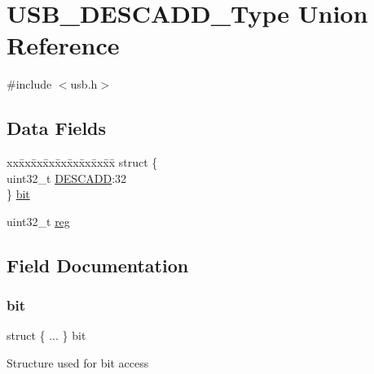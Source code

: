 \hypertarget{union_u_s_b___d_e_s_c_a_d_d___type}{}\section{U\+S\+B\+\_\+\+D\+E\+S\+C\+A\+D\+D\+\_\+\+Type Union Reference}
\label{union_u_s_b___d_e_s_c_a_d_d___type}


{\ttfamily \#include $<$usb.\+h$>$}

\subsection*{Data Fields}
\begin{DoxyCompactItemize}
\item 
\begin{tabbing}
xx\=xx\=xx\=xx\=xx\=xx\=xx\=xx\=xx\=\kill
struct \{\\
\>uint32\_t \mbox{\hyperlink{union_u_s_b___d_e_s_c_a_d_d___type_afb5de23aa0c3ffcad2485cce138306f4}{DESCADD}}:32\\
\} \mbox{\hyperlink{union_u_s_b___d_e_s_c_a_d_d___type_ac9bd64f1dabe296c25ac82012d4e639d}{bit}}\\

\end{tabbing}\item 
uint32\+\_\+t \mbox{\hyperlink{union_u_s_b___d_e_s_c_a_d_d___type_a6b91636401516a477989a336376d7b40}{reg}}
\end{DoxyCompactItemize}


\subsection{Field Documentation}
\mbox{\label{union_u_s_b___d_e_s_c_a_d_d___type_ac9bd64f1dabe296c25ac82012d4e639d}} 
\subsubsection{\texorpdfstring{bit}{bit}}
{\footnotesize\ttfamily struct \{ ... \}   bit}

Structure used for bit access \mbox{\label{union_u_s_b___d_e_s_c_a_d_d___type_afb5de23aa0c3ffcad2485cce138306f4}} 
